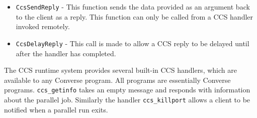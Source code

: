 \documentclass[10pt,dvips]{article}
\begin{document}
\begin{itemize}

\item

\texttt{CcsSendReply} - This function sends the data provided as
an argument back to the client as a reply. This function can only
be called from a CCS handler invoked remotely.

\item

\texttt{CcsDelayReply} - This call is made to allow a CCS reply to
be delayed until after the handler has completed.


\end{itemize}

The CCS runtime system provides several built-in CCS handlers,
which are available to any Converse program. All \charmpp{}
programs are essentially Converse programs. \texttt{ccs\_getinfo}
takes an empty message and responds with information about the
parallel job. Similarly the handler \texttt{ccs\_killport} allows
a client to be notified when a parallel run exits.
\end{document}

